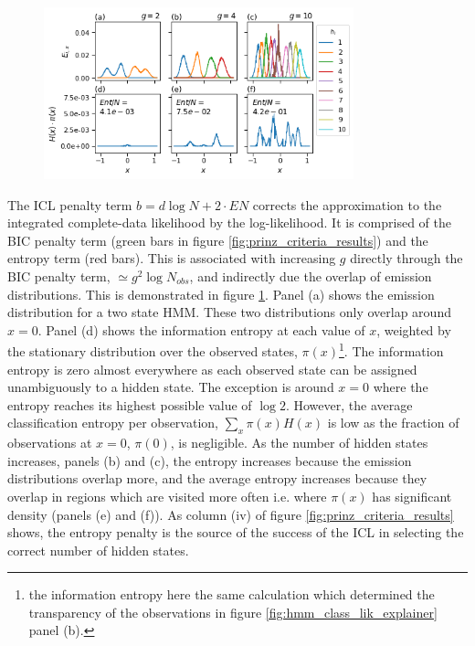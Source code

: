 \begin{figure}
    \centering
    \includegraphics[width=0.8\textwidth]{chapters/hmm_selection/figures/prinz_entropy.png}
    \label{fig:prinz_ent}
\end{figure}

The ICL penalty term $b=d\log{N}+2\cdot EN$ corrects the approximation to the integrated complete-data likelihood by the log-likelihood. It is comprised of the BIC penalty term (green bars in figure \ref{fig:prinz_criteria_results}) and the entropy term (red bars). This is associated with increasing $g$ directly through the BIC penalty term, $\simeq g^{2}\log{N_{obs}}$, and indirectly due the overlap of emission distributions. This is demonstrated in figure \ref{fig:prinz_ent}. Panel (a) shows the emission distribution for a two state HMM. These two distributions only overlap around $x=0$. Panel (d) shows the information entropy at each value of $x$, weighted by the stationary distribution over the observed states, $\pi(x)$\footnote{the information entropy here the same calculation which determined the transparency of the observations in figure \ref{fig:hmm_class_lik_explainer} panel (b).}. The information entropy is zero almost everywhere as each observed state can be assigned unambiguously to a hidden state. The exception is around $x=0$ where the entropy reaches its highest possible value of $\log{2}$. However, the average classification entropy per observation, $\sum_{x}\pi(x)H(x)$ is low as the fraction of observations at $x=0$, $\pi(0)$, is negligible. As the number of hidden states increases, panels (b) and (c), the  entropy increases because the emission distributions overlap more, and the average entropy increases because they overlap in regions which are visited more often i.e. where $\pi(x)$ has significant density (panels (e) and (f)). As column (iv) of figure \ref{fig:prinz_criteria_results} shows, the entropy penalty is the source of the success of the ICL in selecting  the correct number of hidden states. 


